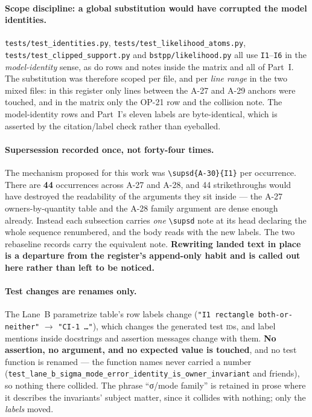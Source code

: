\documentclass[
  10pt,
]{article}
\begin{document}
\paragraph{Scope discipline: a global substitution would have corrupted the model identities.}
\texttt{tests/\allowbreak{}test\_identities.py}, \texttt{tests/\allowbreak{}test\_likelihood\_atoms.py}, \texttt{tests/\allowbreak{}test\_clipped\_support.py} and \texttt{bstpp/\allowbreak{}likelihood.py} all use \texttt{I1}--\texttt{I6} in the \emph{model-identity} sense, as do rows and notes inside the matrix and all of Part~I. The substitution was therefore scoped per file, and per \emph{line range} in the two mixed files: in this register only lines between the A-27 and A-29 anchors were touched, and in the matrix only the OP-21 row and the collision note. The model-identity rows and Part~I's eleven labels are byte-identical, which is asserted by the citation/label check rather than eyeballed.

\paragraph{Supersession recorded once, not forty-four times.}
The mechanism proposed for this work was \texttt{\textbackslash supsd\{A-30\}\{I1\}} per occurrence. There are \textbf{44} occurrences across A-27 and A-28, and 44 strikethroughs would have destroyed the readability of the arguments they sit inside --- the A-27 owners-by-quantity table and the A-28 family argument are dense enough already. Instead each subsection carries \emph{one} \texttt{\textbackslash supsd} note at its head declaring the whole sequence renumbered, and the body reads with the new labels. The two rebaseline records carry the equivalent note. \textbf{Rewriting landed text in place is a departure from the register's append-only habit and is called out here rather than left to be noticed.}

\paragraph{Test changes are renames only.}
The Lane~B parametrize table's row labels change (\texttt{"I1 rectangle both-or-neither"} $\rightarrow$ \texttt{"CI-1 \ldots{}"}), which changes the generated test \textsc{id}s, and label mentions inside docstrings and assertion messages change with them. \textbf{No assertion, no argument, and no expected value is touched}, and no test function is renamed --- the function names never carried a number (\texttt{test\_lane\_b\_sigma\_mode\_error\_identity\_is\_owner\_invariant} and friends), so nothing there collided. The phrase ``σ/mode family'' is retained in prose where it describes the invariants' subject matter, since it collides with nothing; only the \emph{labels} moved.
\end{document}
